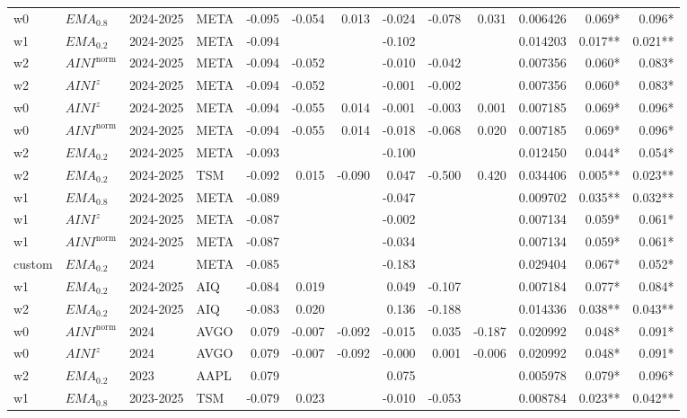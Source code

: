 \begin{longtable}{@{}llllrrrrrrrrr@{}}
w0 & $EMA_{0.8}$ & 2024-2025 & META & -0.095 & -0.054 & 0.013 & -0.024 & -0.078 & 0.031 & 0.006426 & 0.069* & 0.096* \\
w1 & $EMA_{0.2}$ & 2024-2025 & META & -0.094 &  &  & -0.102 &  &  & 0.014203 & 0.017** & 0.021** \\
w2 & $AINI^{\mathrm{norm}}$ & 2024-2025 & META & -0.094 & -0.052 &  & -0.010 & -0.042 &  & 0.007356 & 0.060* & 0.083* \\
w2 & $AINI^{z}$ & 2024-2025 & META & -0.094 & -0.052 &  & -0.001 & -0.002 &  & 0.007356 & 0.060* & 0.083* \\
w0 & $AINI^{z}$ & 2024-2025 & META & -0.094 & -0.055 & 0.014 & -0.001 & -0.003 & 0.001 & 0.007185 & 0.069* & 0.096* \\
w0 & $AINI^{\mathrm{norm}}$ & 2024-2025 & META & -0.094 & -0.055 & 0.014 & -0.018 & -0.068 & 0.020 & 0.007185 & 0.069* & 0.096* \\
w2 & $EMA_{0.2}$ & 2024-2025 & META & -0.093 &  &  & -0.100 &  &  & 0.012450 & 0.044* & 0.054* \\
w2 & $EMA_{0.2}$ & 2024-2025 & TSM & -0.092 & 0.015 & -0.090 & 0.047 & -0.500 & 0.420 & 0.034406 & 0.005** & 0.023** \\
w1 & $EMA_{0.8}$ & 2024-2025 & META & -0.089 &  &  & -0.047 &  &  & 0.009702 & 0.035** & 0.032** \\
w1 & $AINI^{z}$ & 2024-2025 & META & -0.087 &  &  & -0.002 &  &  & 0.007134 & 0.059* & 0.061* \\
w1 & $AINI^{\mathrm{norm}}$ & 2024-2025 & META & -0.087 &  &  & -0.034 &  &  & 0.007134 & 0.059* & 0.061* \\
custom & $EMA_{0.2}$ & 2024 & META & -0.085 &  &  & -0.183 &  &  & 0.029404 & 0.067* & 0.052* \\
w1 & $EMA_{0.2}$ & 2024-2025 & AIQ & -0.084 & 0.019 &  & 0.049 & -0.107 &  & 0.007184 & 0.077* & 0.084* \\
w2 & $EMA_{0.2}$ & 2024-2025 & AIQ & -0.083 & 0.020 &  & 0.136 & -0.188 &  & 0.014336 & 0.038** & 0.043** \\
w0 & $AINI^{\mathrm{norm}}$ & 2024 & AVGO & 0.079 & -0.007 & -0.092 & -0.015 & 0.035 & -0.187 & 0.020992 & 0.048* & 0.091* \\
w0 & $AINI^{z}$ & 2024 & AVGO & 0.079 & -0.007 & -0.092 & -0.000 & 0.001 & -0.006 & 0.020992 & 0.048* & 0.091* \\
w2 & $EMA_{0.2}$ & 2023 & AAPL & 0.079 &  &  & 0.075 &  &  & 0.005978 & 0.079* & 0.096* \\
w1 & $EMA_{0.8}$ & 2023-2025 & TSM & -0.079 & 0.023 &  & -0.010 & -0.053 &  & 0.008784 & 0.023** & 0.042** \\

\end{longtable}

